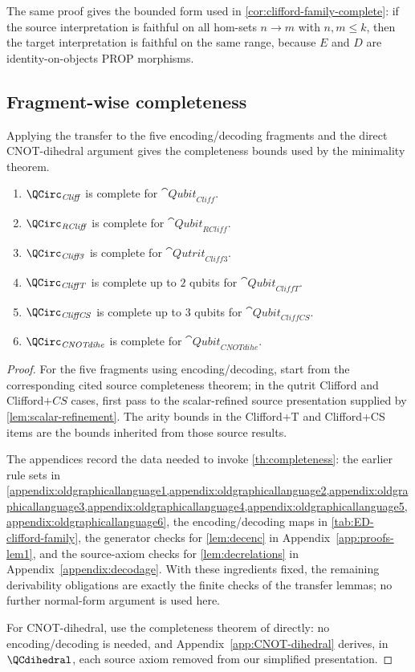 The same proof gives the bounded form used in \cref{cor:clifford-family-complete}: if the source
interpretation is faithful on all hom-sets \(n\to m\) with \(n,m\le k\), then the target
interpretation is faithful on the same range, because \(E\) and \(D\) are identity-on-objects PROP
morphisms.

\subsection{Fragment-wise completeness}

Applying the transfer to the five encoding/decoding fragments and the direct CNOT-dihedral
argument gives the completeness bounds used by the minimality theorem.

\begin{theorem}\label{cor:clifford-family-complete}
\begin{enumerate}
\item \(\QCirc_{\mathit{Cliff}}\) is complete for \(\cat{Qubit}_{\mathit{Cliff}}\).
\item \(\QCirc_{\mathit{RCliff}}\) is complete for \(\cat{Qubit}_{\mathit{RCliff}}\).
\item \(\QCirc_{\mathit{Cliff3}}\) is complete for \(\cat{Qutrit}_{\mathit{Cliff3}}\).
\item \(\QCirc_{\mathit{CliffT}}\) is complete up to \(2\) qubits for \(\cat{Qubit}_{\mathit{CliffT}}\).
\item \(\QCirc_{\mathit{CliffCS}}\) is complete up to \(3\) qubits for \(\cat{Qubit}_{\mathit{CliffCS}}\).
\item \(\QCirc_{\mathit{CNOTdihe}}\) is complete for \(\cat{Qubit}_{\mathit{CNOTdihe}}\).
\end{enumerate}
\end{theorem}

\begin{proof}
For the five fragments using encoding/decoding, start from the corresponding cited source
completeness theorem; in the qutrit Clifford and Clifford\(+CS\) cases, first pass to the
scalar-refined source presentation supplied by \cref{lem:scalar-refinement}.  The arity bounds in
the Clifford+T and Clifford+CS items are the bounds inherited from those source results.

The appendices record the data needed to invoke \cref{th:completeness}: the earlier rule sets in
\cref{appendix:oldgraphicallanguage1,appendix:oldgraphicallanguage2,appendix:oldgraphicallanguage3,appendix:oldgraphicallanguage4,appendix:oldgraphicallanguage5,appendix:oldgraphicallanguage6},
the encoding/decoding maps in \cref{tab:ED-clifford-family}, the generator checks for
\cref{lem:decenc} in Appendix~\ref{app:proofs-lem1}, and the source-axiom checks for
\cref{lem:decrelations} in Appendix~\ref{appendix:decodage}.  With these ingredients fixed, the
remaining derivability obligations are exactly the finite checks of the transfer lemmas; no further
normal-form argument is used here.

For CNOT-dihedral, use the completeness theorem of \cite{AmyCNOTDihedral} directly: no
encoding/decoding is needed, and Appendix~\ref{app:CNOT-dihedral} derives, in \(\QCdihedral\),
each source axiom removed from our simplified presentation.
\end{proof}
